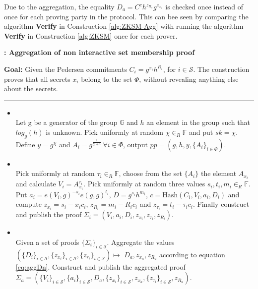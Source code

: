 Due to the aggregation, the equality $D_a=C^ch^{z_{R_a}}g^{z_{x_a}}$ is checked once instead of once for each proving party in the protocol. This can bee seen by comparing the algorithm \textbf{Verify} in Construction \ref{alg:ZKSM-Agg} with running the algorithm \textbf{Verify} in Construction \ref{alg:ZKSM} once for each prover. 

\begin{algorithm}[]
\caption{\textbf{: Aggregation of non interactive set membership proof}}
\textbf{Goal:}  Given the Pedersen commitments $C_i=g^{x_i} h^{R_i}$, for $i\in\mathcal{S}$. The construction  proves that all secrets $x_i$ belong to the set $\Phi$, without revealing anything else about the secrets.
\vspace{3pt}\hrule\vspace{2pt}
\begin{itemize}
  \item{}\\
 Let g be a generator of the group $\mathds{G}$ and $h$ an element in the group such that $log_g(h)$ is unknown.  
Pick uniformly at random $\chi\in_R\mathds{F}$ and put $sk=\chi$. Define $y=g^\chi$ and $A_i=g^{\frac{1}{\chi+i}} \:\forall i\in\Phi$, output $pp=(g,h,y,\{A_i\}_{i\in\Phi})$.

\item{}\\
Pick uniformly at random $\tau_i\in_R\mathds{F}$, choose from the set $\{A_i\}$ the element $A_{x_i}$ and calculate $V_i=A_{x_i}^{\tau_i}$. Pick uniformly at random three values $s_i,t_i,m_i\in_R\mathds{F}$. Put $a_i=e(V_i,g)^{-s_i}e(g,g)^{t_i}$,  $D=g^{s_i}h^{m_i}$, $c=\text{Hash}(C_i,V_i,a_i,D_i)$ and compute $z_{x_i} = s_i-x_i c_i$, $z_{R_i} = m_i-R_ic_i$ and $z_{\tau_i}= t_i-\tau_i c_i$.  Finally construct and publish the proof $\Sigma_i = (V_i,a_i,D_i,z_{x_i},z_{\tau_i},z_{R_i})$.

\item {} \\
Given a set of proofs  $\{\Sigma_i\}_{i\in\mathcal{S}}$. Aggregate the values $( \{D_i \}_{i\in\mathcal{S} }, \{ z_{x_i}\}_{i\in\mathcal{S} }, \{ z_{r_i}\}_{i\in\mathcal{S}  }) \mapsto$ $ D_a,z_{x_a},z_{R_a}$ according to equation \eqref{eq:aggDn}. Construct and publish the aggregated proof $\Sigma_a = (\{V_i\}_{i\in\mathcal{S} },\{a_i\}_{i\in\mathcal{S} },D_a,\{z_{x_i}\}_{i\in\mathcal{S} }, z_{x_a}, \{z_{\tau_i}\}_{i\in\mathcal{S} },z_{R_a})$.


\end{itemize}
\end{algorithm}
